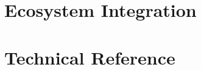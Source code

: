 \documentclass[12pt,a4paper]{report}
\theoremstyle{definition}
\theoremstyle{remark}
\begin{document}
\part{Ecosystem Integration}




\appendix

\part{Technical Reference}






\end{document}
